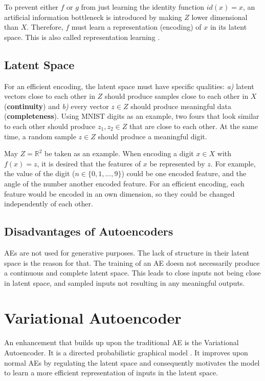 \documentclass[a4paper]{IEEEtran}
\begin{document}
To prevent either $f$ or $g$ from just learning the identity function $id(x) = x$, an artificial information bottleneck is introduced by making $Z$ lower dimensional than $X$. Therefore, $f$ must learn a representation (encoding) of $x$ in its latent space. This is also called representation learning \cite{DBLP:journals/corr/abs-1206-5538}. 

\subsection{Latent Space}
For an efficient encoding, the latent space must have specific qualities: \textit{a)} latent vectors close to each other in $Z$ should produce samples close to each other in $X$ (\textbf{continuity}) and \textit{b)} every vector $z \in Z$ should produce meaningful data (\textbf{completeness}). Using MNIST digits as an example, two fours that look similar to each other should produce $z_1, z_2 \in Z$ that are close to each other. At the same time, a random sample $z \in Z$ should produce a meaningful digit.

May $Z = \mathbb{R}^{2}$ be taken as an example. When encoding a digit $x \in X$ with $f(x) = z$, it is desired that the features of $x$ be represented by $z$. For example, the value of the digit ($n \in \{0,1,...,9\}$) could be one encoded feature, and the angle of the number another encoded feature. For an efficient encoding, each feature would be encoded in an own dimension, so they could be changed independently of each other.

\subsection{Disadvantages of Autoencoders}
AEs are not used for generative purposes. The lack of structure in their latent space is the reason for that. The training of an AE doesn not necessarily produce a continuous and complete latent space. This leads to close inputs not being close in latent space, and sampled inputs not resulting in any meaningful outputs.

\section{Variational Autoencoder}
An enhancement that builds up upon the traditional AE is the Variational Autoencoder. It is a directed probabilistic graphical model \cite{kingma2014autoencoding}. It improves upon normal AEs by regulating the latent space and consequently motivates the model to learn a more efficient representation of inputs in the latent space.
\end{document}
